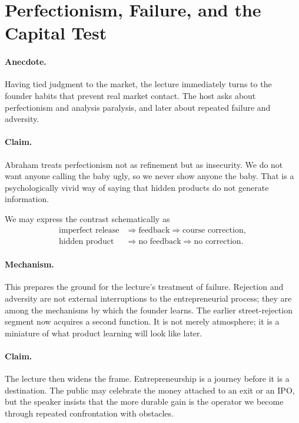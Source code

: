 \section{Perfectionism, Failure, and the Capital Test}

\paragraph{Anecdote.} Having tied judgment to the market, the lecture immediately turns to the founder habits that prevent real market contact. The host asks about perfectionism and analysis paralysis, and later about repeated failure and adversity.

\paragraph{Claim.} Abraham treats perfectionism not as refinement but as insecurity. We do not want anyone calling the baby ugly, so we never show anyone the baby. That is a psychologically vivid way of saying that hidden products do not generate information.

We may express the contrast schematically as
\begin{align}
\text{imperfect release}
&\Rightarrow \text{feedback}
\Rightarrow \text{course correction},\\
\text{hidden product}
&\Rightarrow \text{no feedback}
\Rightarrow \text{no correction}.
\end{align}

\paragraph{Mechanism.} This prepares the ground for the lecture's treatment of failure. Rejection and adversity are not external interruptions to the entrepreneurial process; they are among the mechanisms by which the founder learns. The earlier street-rejection segment now acquires a second function. It is not merely atmosphere; it is a miniature of what product learning will look like later.

\paragraph{Claim.} The lecture then widens the frame. Entrepreneurship is a journey before it is a destination. The public may celebrate the money attached to an exit or an IPO, but the speaker insists that the more durable gain is the operator we become through repeated confrontation with obstacles.

